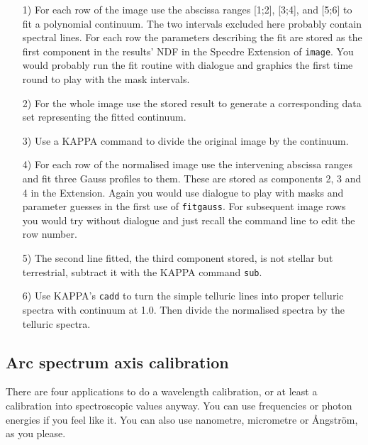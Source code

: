 \documentclass[11pt,twoside]{article}
\newcommand{\htmlref}[2]{#1}
\newcommand{\xref}[3]{#1}
\newcommand{\xlabel}[1]{}
\begin{document}
\begin{itemize}
\item[1)] For each row of the image use the abscissa ranges
   [1;2], [3;4], and [5;6] to
\htmlref{fit a polynomial}{FITPOLY}
   continuum. The two intervals excluded here probably contain spectral
   lines. For each row the parameters describing the fit are stored as
   the first component in the results' NDF in the Specdre Extension of
   {\tt image}. You would probably run the fit routine with dialogue and
   graphics the first time round to play with the mask intervals.

\item[2)] For the whole image use the stored result to
\htmlref{generate a corresponding data set}{EVALFIT}
   representing the fitted continuum.

\item[3)] Use a
\xref{KAPPA}{sun95}{DIV}
   command to divide the original image by the continuum.

\item[4)] For each row of the normalised image use the intervening
   abscissa ranges and
\htmlref{fit three Gauss profiles}{FITGAUSS}
   to them. These are stored as components 2, 3 and 4 in the Extension.
   Again you would use dialogue to play with masks and parameter guesses
   in the first use of {\tt fitgauss}.  For subsequent image rows you
   would try without dialogue and just recall the command line to edit
   the row number.

\item[5)] The second line fitted, the third component stored, is not
   stellar but terrestrial, subtract it with the KAPPA command
{\tt\xref{sub}{sun95}{SUB}}.

\item[6)] Use KAPPA's
{\tt\xref{cadd}{sun95}{CADD}}
   to turn the simple telluric lines into proper telluric spectra with
   continuum at 1.0. Then divide the normalised spectra by the telluric
   spectra.
\end{itemize}


\subsection{\label{specdreaxcalib}\xlabel{specdreaxcalib}Arc spectrum axis calibration}

   There are four applications to do a wavelength calibration, or at
   least a calibration into spectroscopic values anyway.  You can use
   frequencies or photon energies if you feel like it.  You can also use
   nanometre, micrometre or \AA ngstr\"om, as you please.
\end{document}
